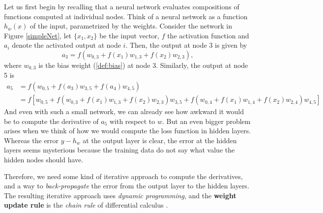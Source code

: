 \documentclass[nobib]{tufte-handout} %
\begin{document}
  Let us first begin by recalling that a neural network evaluates compositions of functions computed at individual nodes. Think of a neural network as a function $h_w(x)$ of the input, parametrized by the weights. Consider the network in Figure \ref{simpleNet}, let $\{x_1,x_2\}$ be the input vector, $f$ the activation function and $a_i$ denote the activated output at node $i$. Then, the output at node 3 is given by
  $$a_3 = f(w_{0, 3} + f(x_1)w_{1,3} + f(x_2)w_{2,3}), $$
  where $w_{0,3}$ is the bias weight (\autoref{def:bias}) at node 3. Similarly, the output at node 5 is
  \begin{equation*}
    \begin{split}
      a_5 &= f( w_{0,5} + f(a_3) w_{3,5} + f(a_4) w_{4,5}  )\\ 
      &= f[w_{0,5} + f(w_{0, 3} + f(x_1)w_{1,3} + f(x_2)w_{2,3})w_{3,5} +f(w_{0, 4} + f(x_1)w_{1,4} + f(x_2)w_{2,4})w_{4,5} ]
    \end{split}
  \end{equation*}
  And even with such a small network, we can already see how awkward it would be to compute the derivative of $a_5$ with respect to $w$. But an even bigger problem arises when we think of how we would compute the loss function in hidden layers. Whereas the error $y -h_w$ at the output layer is clear, the error at the hidden layers seems mysterious because the training data do not say what value the hidden nodes should have.

  Therefore, we need some kind of iterative approach to compute the derivatives, and a way to \textit{back-propagate} the error from the output layer to the hidden layers. The resulting iterative approach uses \textit{dynamic programming}, and the \textbf{weight update rule} is the \textit{chain rule} of differential calculus \citep{inbook:Aggarwal-3.2}.
\end{document}
